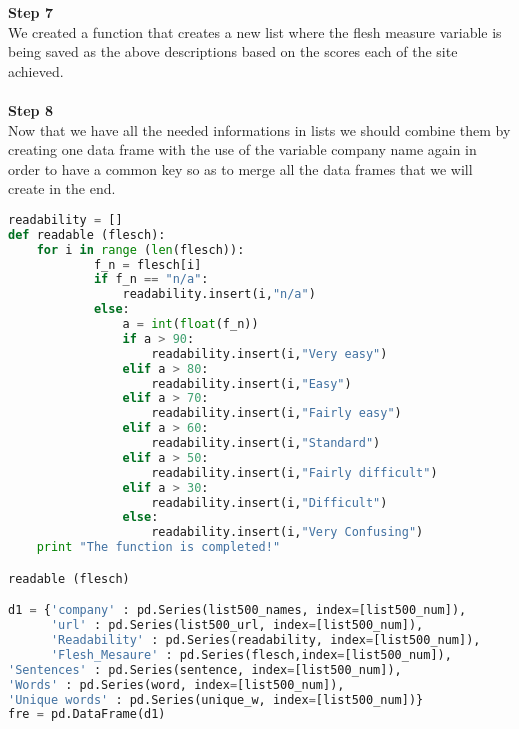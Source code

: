 \documentclass{article}
\begin{document}
\textbf{Step 7} \\
We created a function that creates a new list where the flesh measure variable is being saved as the above descriptions based on the scores each of the site achieved.\\\\
\textbf{Step 8} \\
Now that we have all the needed informations in lists we should combine them by creating one data frame with the use of the variable company name again in order to have a common key so as to merge all the data frames that we will create in the end.
\begin{lstlisting}[language=Python]
readability = []
def readable (flesch):
    for i in range (len(flesch)):
            f_n = flesch[i]
            if f_n == "n/a":
                readability.insert(i,"n/a")                
            else:
                a = int(float(f_n))
                if a > 90:    
                    readability.insert(i,"Very easy")                    
                elif a > 80:
                    readability.insert(i,"Easy")
                elif a > 70:
                    readability.insert(i,"Fairly easy")
                elif a > 60:
                    readability.insert(i,"Standard")
                elif a > 50:
                    readability.insert(i,"Fairly difficult")
                elif a > 30:
                    readability.insert(i,"Difficult")
                else:
                    readability.insert(i,"Very Confusing")                    
    print "The function is completed!"

readable (flesch)

d1 = {'company' : pd.Series(list500_names, index=[list500_num]),
      'url' : pd.Series(list500_url, index=[list500_num]),
      'Readability' : pd.Series(readability, index=[list500_num]),
      'Flesh_Mesaure' : pd.Series(flesch,index=[list500_num]),
'Sentences' : pd.Series(sentence, index=[list500_num]),
'Words' : pd.Series(word, index=[list500_num]),
'Unique words' : pd.Series(unique_w, index=[list500_num])}
fre = pd.DataFrame(d1)    
\end{lstlisting}
\end{document}
